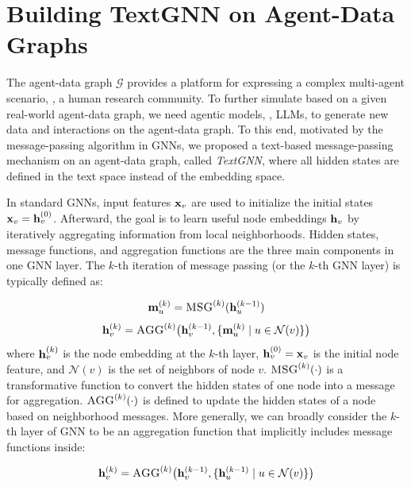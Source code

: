 \section{Building TextGNN on Agent-Data Graphs}
\label{sec:text-gnn}

The agent-data graph $\mathcal{G}$ provides a platform for expressing a complex multi-agent scenario, \eg, a human research community.
To further simulate based on a given real-world agent-data graph, we need agentic models, \eg, LLMs, to generate new data and interactions on the agent-data graph.
To this end, motivated by the message-passing algorithm in GNNs, we proposed a text-based message-passing mechanism on an agent-data graph, called \textit{TextGNN}, where all hidden states are defined in the text space instead of the embedding space.



In standard GNNs, input features $\mathbf{x}_v$ are used to initialize the initial states $\mathbf{x}_v = \mathbf{h}_v^{(0)}$. Afterward, the goal is to learn useful node embeddings \( \mathbf{h}_v \) by iteratively aggregating information from local neighborhoods. Hidden states, message functions, and aggregation functions are the three main components in one GNN layer. The \( k \)-th iteration of message passing (or the \( k \)-th GNN layer) is typically defined as:

\begingroup
\small
\begin{equation}
    \label{eq:gnn}
    \mathbf{m}_u^{(k)} = \textsc{MSG}^{(k)}(\mathbf{h}_u^{(k-1)})
\end{equation}
\endgroup
\begingroup
\small
\begin{equation}
    \label{eq:gnn2}
    \mathbf{h}_v^{(k)} = \textsc{AGG}^{(k)}\big(\mathbf{h}_v^{(k-1)}, \{\mathbf{m}_u^{(k)} \mid u \in \mathcal{N}(v)\}\big)
\end{equation}
\endgroup
where \( \mathbf{h}_v^{(k)} \) is the node embedding at the \( k \)-th layer, \( \mathbf{h}_v^{(0)} = \mathbf{x}_v \) is the initial node feature, and \( \mathcal{N}(v) \) is the set of neighbors of node \( v \). \(\textsc{MSG}^{(k)}(\cdot)\) is a transformative function to convert the hidden states of one node into a message for aggregation. \(\textsc{AGG}^{(k)}(\cdot)\) is defined to update the hidden states of a node based on neighborhood messages. More generally, we can broadly consider the $k$-th layer of GNN to be an aggregation function that implicitly includes message functions inside:

\begingroup
\small
\begin{equation}
\mathbf{h}_v^{(k)} = \textsc{AGG}^{(k)}\big(\mathbf{h}_v^{(k-1)}, \{\mathbf{h}_u^{(k-1)} \mid u \in \mathcal{N}(v)\}\big)
\end{equation}
\endgroup

